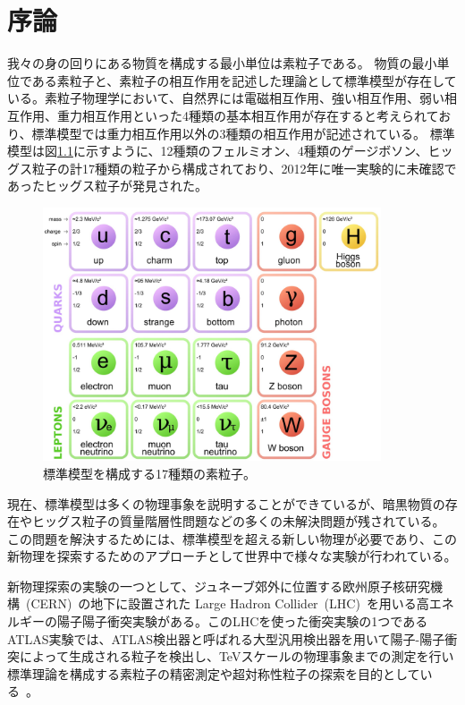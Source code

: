 \chapter{序論}
我々の身の回りにある物質を構成する最小単位は素粒子である。
物質の最小単位である素粒子と、素粒子の相互作用を記述した理論として標準模型が存在している。素粒子物理学において、自然界には電磁相互作用、強い相互作用、弱い相互作用、重力相互作用といった4種類の基本相互作用が存在すると考えられており、標準模型では重力相互作用以外の3種類の相互作用が記述されている。
標準模型は図\ref{fig:標準模型}に示すように、12種類のフェルミオン、4種類のゲージボソン、ヒッグス粒子の計17種類の粒子から構成されており、2012年に唯一実験的に未確認であったヒッグス粒子が発見された\cite{article:Higgs_boson}。
\begin{figure}[tb]
  \centering
  \includegraphics[clip, width=10cm]{fig/1/standardmodel.jpg}
  \caption{標準模型を構成する17種類の素粒子\cite{article:elementary_particles}。}
  \label{fig:標準模型}
\end{figure}

現在、標準模型は多くの物理事象を説明することができているが、暗黒物質の存在やヒッグス粒子の質量階層性問題などの多くの未解決問題が残されている。
この問題を解決するためには、標準模型を超える新しい物理が必要であり、この新物理を探索するためのアプローチとして世界中で様々な実験が行われている。

新物理探索の実験の一つとして、ジュネーブ郊外に位置する欧州原子核研究機構~(CERN)~\cite{article:CERN}の地下に設置された Large Hadron Collider~(LHC)~\cite{article:LHC}を用いる高エネルギーの陽子陽子衝突実験がある。このLHCを使った衝突実験の1つであるATLAS実験では、ATLAS検出器と呼ばれる大型汎用検出器を用いて陽子-陽子衝突によって生成される粒子を検出し、TeVスケールの物理事象までの測定を行い標準理論を構成する素粒子の精密測定や超対称性粒子の探索を目的としている~\cite{article:ATLAS}。

